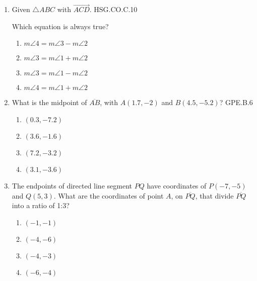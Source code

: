 \documentclass[12pt, twoside]{article}
\begin{document}
\begin{enumerate}
\item Given $\triangle ABC$ with $\overrightarrow{ACD}$. \hfill HSG.CO.C.10
  \begin{center}
  \end{center}
  Which equation is always true?
  \begin{multicols}{2}
  \begin{enumerate}
    \item $m\angle 4 = m\angle 3 - m\angle 2$
    \item $m\angle 3 = m\angle 1 + m\angle 2$
    \item $m\angle 3 = m\angle 1 - m\angle 2$
    \item $m\angle 4 = m\angle 1 + m\angle 2$
  \end{enumerate}
  \end{multicols}

\newpage
\item What is the midpoint of $\overline{AB}$, with $A(1.7,-2)$ and $B(4.5,-5.2)$? \hfill GPE.B.6
\begin{multicols}{2}
  \begin{enumerate}
    \item $(0.3,-7.2)$
    \item $(3.6,-1.6)$
    \item $(7.2,-3.2)$
    \item $(3.1,-3.6)$
  \end{enumerate}
  \end{multicols} \vspace{1cm}

\item The endpoints of directed line segment $PQ$ have coordinates of $P(-7,-5)$ and $Q(5,3)$. What are the coordinates of point $A$, on $\overline{PQ}$, that divide $\overline{PQ}$ into a ratio of 1:3?
\begin{multicols}{2}
  \begin{enumerate}
    \item $(-1,-1)$
    \item $(-4,-6)$
    \item $(-4,-3)$
    \item $(-6,-4)$
  \end{enumerate}
  \end{multicols} \vspace{2cm}


\end{enumerate}
\end{document}
